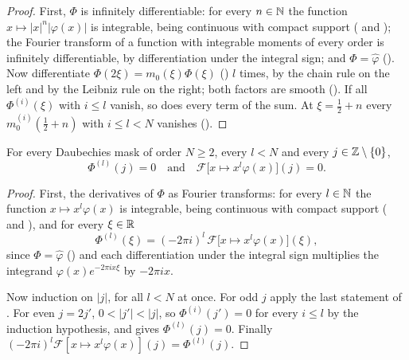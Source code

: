 \begin{proof}
\leanok
{}
First, $\Phi$ is infinitely differentiable: for every $n \in \mathbb{N}$ the function
$x \mapsto |x|^n |\varphi(x)|$ is integrable, being continuous with compact support
( and ); the Fourier transform of
a function with integrable moments of every order is infinitely differentiable, by
differentiation under the integral sign; and $\Phi = \widehat\varphi$
(). Now differentiate $\Phi(2\xi) = m_0(\xi) \Phi(\xi)$
() $l$ times, by the chain rule on the left and by the
Leibniz rule on the right; both factors are smooth (). If all
$\Phi^{(i)}(\xi)$ with $i \leq l$ vanish, so does every term of the sum. At $\xi = \frac12 + n$
every $m_0^{(i)}(\frac12 + n)$ with $i \leq l < N$ vanishes ().
\end{proof}

\begin{proposition}
\label{prop:daub-symbol-product-integer-zeros}
\leanok
{}
For every Daubechies mask of order $N \geq 2$, every $l < N$ and every
$j \in \mathbb{Z} \setminus \{0\}$,
\[
  \Phi^{(l)}(j) = 0 \quad\text{and}\quad
  \mathcal F\bigl[x \mapsto x^l \varphi(x)\bigr](j) = 0 .
\]
\end{proposition}

\begin{proof}
\leanok
{}
First, the derivatives of $\Phi$ as Fourier transforms: for every $l \in \mathbb{N}$ the function
$x \mapsto x^l \varphi(x)$ is integrable, being continuous with compact support
( and ), and for every
$\xi \in \mathbb{R}$
\[
  \Phi^{(l)}(\xi) = (-2\pi i)^l \, \mathcal F\bigl[x \mapsto x^l \varphi(x)\bigr](\xi) ,
\]
since $\Phi = \widehat\varphi$ () and each differentiation under
the integral sign multiplies the integrand $\varphi(x) e^{-2\pi i x \xi}$ by $-2\pi i x$.

Now induction on $|j|$, for all $l < N$ at once. For odd $j$ apply the last statement of
. For even $j = 2j'$, $0 < |j'| < |j|$, so
$\Phi^{(i)}(j') = 0$ for every $i \leq l$ by the induction hypothesis, and
 gives $\Phi^{(l)}(j) = 0$. Finally
$(-2\pi i)^l \mathcal F[x \mapsto x^l \varphi(x)](j) = \Phi^{(l)}(j)$.
\end{proof}

